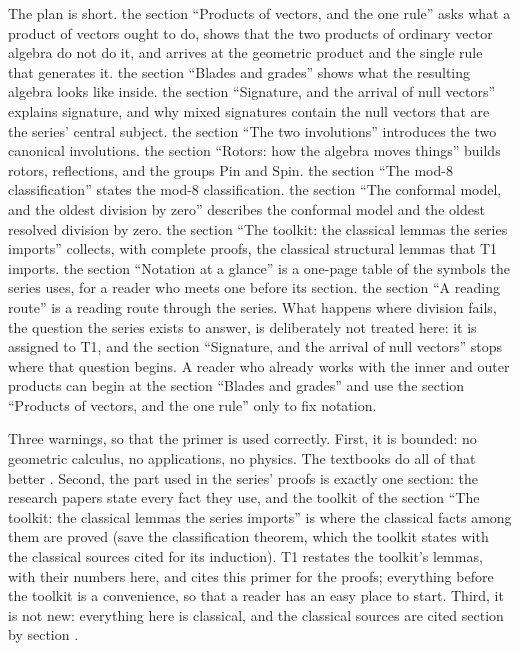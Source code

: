\documentclass[11pt]{article}
\theoremstyle{definition}
\theoremstyle{plain}
\providecommand{\Pin}{}\renewcommand{\Pin}{\mathrm{Pin}}
\providecommand{\Spin}{}\renewcommand{\Spin}{\mathrm{Spin}}
\begin{document}
The plan is short. the section ``Products of vectors, and the one rule'' asks what a product of vectors ought to do, shows that the two products of ordinary vector algebra do not do it, and arrives at the geometric product and the single rule that generates it. the section ``Blades and grades'' shows what the resulting algebra looks like inside. the section ``Signature, and the arrival of null vectors'' explains signature, and why mixed signatures contain the null vectors that are the series' central subject. the section ``The two involutions'' introduces the two canonical involutions. the section ``Rotors: how the algebra moves things'' builds rotors, reflections, and the groups $\Pin$ and $\Spin$. the section ``The mod-8 classification'' states the mod-8 classification. the section ``The conformal model, and the oldest division by zero'' describes the conformal model and the oldest resolved division by zero. the section ``The toolkit: the classical lemmas the series imports'' collects, with complete proofs, the classical structural lemmas that T1 \cite{ButlerT1} imports. the section ``Notation at a glance'' is a one-page table of the symbols the series uses, for a reader who meets one before its section. the section ``A reading route'' is a reading route through the series. What happens where division fails, the question the series exists to answer, is deliberately not treated here: it is assigned to T1, and the section ``Signature, and the arrival of null vectors'' stops where that question begins. A reader who already works with the inner and outer products can begin at the section ``Blades and grades'' and use the section ``Products of vectors, and the one rule'' only to fix notation.

Three warnings, so that the primer is used correctly. First, it is bounded: no geometric calculus, no applications, no physics. The textbooks do all of that better \cite{Macdonald2010, DoranLasenby2003, DFM2007, HestenesSobczyk1984}. Second, the part used in the series' proofs is exactly one section: the research papers state every fact they use, and the toolkit of the section ``The toolkit: the classical lemmas the series imports'' is where the classical facts among them are proved (save the classification theorem, which the toolkit states with the classical sources cited for its induction). T1 restates the toolkit's lemmas, with their numbers here, and cites this primer for the proofs; everything before the toolkit is a convenience, so that a reader has an easy place to start. Third, it is not new: everything here is classical, and the classical sources are cited section by section \cite{Porteous1995, Lounesto2001, Lam2005, Chevalley1997, ABS1964}.
\end{document}
